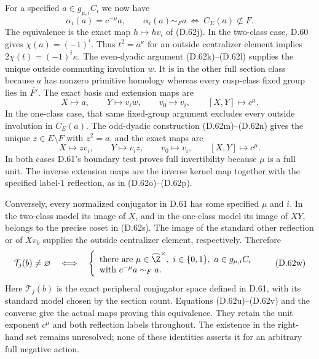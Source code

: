 For a specified $a\in g_{\mu,i}C_i$ we now have
\[
 \alpha_i(a)=c^{-\mu}a,\qquad
 \alpha_i(a)\sim_F a
       \ \Longleftrightarrow\
                 C_E(a)\not\subset F.                  \tag{D.62t}
\]
The equivalence is the exact map $h\mapsto hv_i$
of (D.62j). In the two-class case, D.60 gives
$\chi(a)=(-1)^i$. Thus $t^2=a^\kappa$ for an
outside centralizer element implies
$2\chi(t)=(-1)^i\kappa$.
The even-dyadic argument (D.62k)--(D.62l) supplies
the unique outside commuting involution $w$.
It is in the other full section class because
$a$ has nonzero primitive homology whereas
every cusp-class fixed group lies in
$\overline{F'}$. The exact basis and extension maps are
\[
 X\longmapsto a,\qquad Y\longmapsto v_iw,\qquad
 v_0\longmapsto v_i,\qquad [X,Y]\longmapsto c^\mu.
                                                        \tag{D.62u}
\]
In the one-class case, that same fixed-group
argument excludes every outside involution in
$C_E(a)$. The odd-dyadic construction
(D.62m)--(D.62n) gives the unique $z\in E\setminus F$
with $z^2=a$, and the exact maps are
\[
 X\longmapsto zv_i,\qquad Y\longmapsto v_i z,\qquad
 v_0\longmapsto v_i,\qquad [X,Y]\longmapsto c^\mu.
                                                        \tag{D.62v}
\]
In both cases D.61's boundary test proves full
invertibility because $\mu$ is a full unit.
The inverse extension maps are the inverse kernel
map together with the specified label-$1$ reflection,
as in (D.62o)--(D.62p).

Conversely, every normalized conjugator in D.61
has some specified $\mu$ and $i$. In the two-class
model its image of $X$, and in the one-class model
its image of $XY$, belongs to the precise coset
in (D.62s). The image of the standard other
reflection or of $Xv_0$ supplies the outside
centralizer element, respectively. Therefore
\[
 \mathcal T_j(b)\ne\varnothing
 \quad\Longleftrightarrow\quad
 \left\{\begin{array}{l}
 \text{there are }\mu\in\widehat\Z^\times,\ i\in\{0,1\},
       \ a\in g_{\mu,i}C_i\\
 \text{with }c^{-\mu}a\sim_F a .
 \end{array}\right.
                                                        \tag{D.62w}
\]
Here $\mathcal T_j(b)$ is the exact peripheral
conjugator space defined in D.61, with its standard
model chosen by the section count. Equations
(D.62u)--(D.62v) and the converse give the actual
maps proving this equivalence. They retain the
unit exponent $c^\mu$ and both reflection labels
throughout. The existence in the right-hand set
remains unresolved; none of these identities
asserts it for an arbitrary full negative action.
